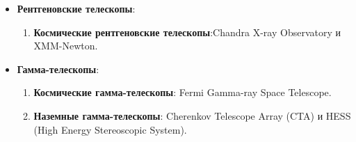 \documentclass[12pt]{article}
\begin{document}
\begin{itemize}
		\item\textbf{Рентгеновские телескопы}:	
		\begin{enumerate}
			\item 	\textbf{Космические рентгеновские телескопы}:Chandra X-ray Observatory и XMM-Newton.
		\end{enumerate}	
		
		\item\textbf{Гамма-телескопы}:	
		\begin{enumerate}
			\item 	\textbf{Космические гамма-телескопы}: Fermi Gamma-ray Space Telescope.
				\item 	\textbf{Наземные гамма-телескопы}: Cherenkov Telescope Array (CTA) и HESS (High Energy Stereoscopic System).
		\end{enumerate}		
	\end{itemize} 
	
\end{document}
